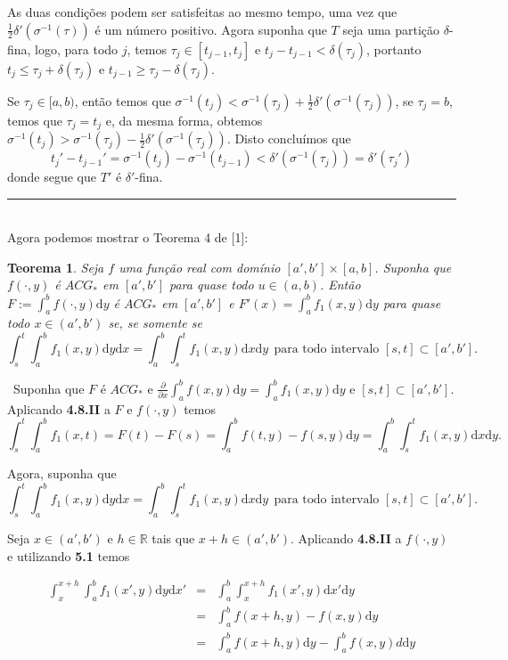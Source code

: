 \documentclass[12pt, a4paper]{article}
\newtheorem{thrm}[mydef]{Teorema}
\def\dem{\par\smallbreak\noindent {\textit{ Demonstração:}} \ }
\def\eop{\hfill\rule{2.5mm}{2.5mm}}
\theoremstyle{definition}
\begin{document}
As duas condições podem ser satisfeitas ao mesmo tempo, uma vez que $\frac{1}{2}\delta'\left(\sigma^{-1}(\tau)\right)$ é um número positivo. Agora suponha que $T$ seja uma partição $\delta$-fina, logo, para todo $j$, temos $\tau_j\in[t_{j-1},t_j]$ e $t_j-t_{j-1}<\delta(\tau_j)$, portanto $t_j \leq \tau_j+\delta(\tau_j)$ e $t_{j-1}\geq \tau_j-\delta(\tau_j)$. 

Se $\tau_j\in [a,b)$, então temos que $\sigma^{-1}(t_j)< \sigma^{-1}(\tau_j)+\frac{1}{2}\delta'\left(\sigma^{-1}(\tau_j)\right)$, se $\tau_j=b$, temos que $\tau_j=t_j$ e, da mesma forma, obtemos  $\sigma^{-1}(t_j) > \sigma^{-1}(\tau_j)-\frac{1}{2}\delta'\left(\sigma^{-1}(\tau_j)\right)$. Disto concluímos que $$t_j'-t_{j-1}'=\sigma^{-1}(t_j)-\sigma^{-1}(t_{j-1})< \delta'\left(\sigma^{-1}(\tau_j)\right)=\delta'(\tau_j')$$ donde segue que $T'$ é $\delta'$-fina. \eop \\

Agora podemos mostrar o Teorema 4 de [1]:

\begin{thrm}
	
	Seja $f$ uma função real com domínio $[a',b']\times [a,b]$. Suponha que $f(\cdot , y)$ é $ACG_*$ em $[a',b']$ para quase todo $u\in (a,b)$. Então $F:=\int_a^b f(\cdot , y) \text{d}y$ é $ACG_*$ em $[a',b']$ e $F'(x)=\int_a^b f_1(x,y) \text{d}y$ para quase todo $x\in(a',b')$ se, se somente se $$\int_s^t\int_a^b f_1(x,y) \text{d}y  \text{d}x=\int_a^b\int_s^t f_1(x,y) \text{d}x  \text{d}y \ \ \text{para todo intervalo }[s,t]\subset [a',b'].$$
	
\end{thrm} 

\dem Suponha que $F$ é $ACG_*$ e $\frac{\partial }{\partial x}\int_a^b f(x,y) \text{d}y= \int_a^b f_1(x,y) \text{d}y$ e $[s,t]\subset [a', b']$. Aplicando \textbf{4.8.II} a $F$ e $f(\cdot , y)$ temos $$\int_s^t \int_a^b f_1(x,t)=F(t)-F(s)=\int_a^b f(t,y)-f(s,y) \text{d}y=\int_a^b\int_s^t f_1(x,y) \text{d}x  \text{d}y. $$

Agora, suponha que  $$\int_s^t\int_a^b f_1(x,y) \text{d}y  \text{d}x=\int_a^b\int_s^t f_1(x,y) \text{d}x  \text{d}y \ \ \text{para todo intervalo }[s,t]\subset [a',b'].$$

Seja $x\in (a',b')$ e $h\in\mathbb{R}$ tais que $x+h\in (a',b')$. Aplicando \textbf{4.8.II} a $f(\cdot, y)$ e utilizando \textbf{5.1} temos

$$\begin{array}{lll}

\displaystyle\int_x^{x+h}\displaystyle\int_a^b f_1(x',y) \text{d}y  \text{d}x' & = & \displaystyle\int_a^b \displaystyle\int_x^{x+h} f_1(x',y) \text{d}x' \text{d}y \\
 \ & = & \displaystyle\int_a^b f(x+h,y)-f(x,y) \text{d}y \\
 \ & = & \displaystyle\int_a^b f(x+h,y) \text{d}y-\int_a^bf(x,y)d \text{d}y
 \end{array}$$
\end{document}
